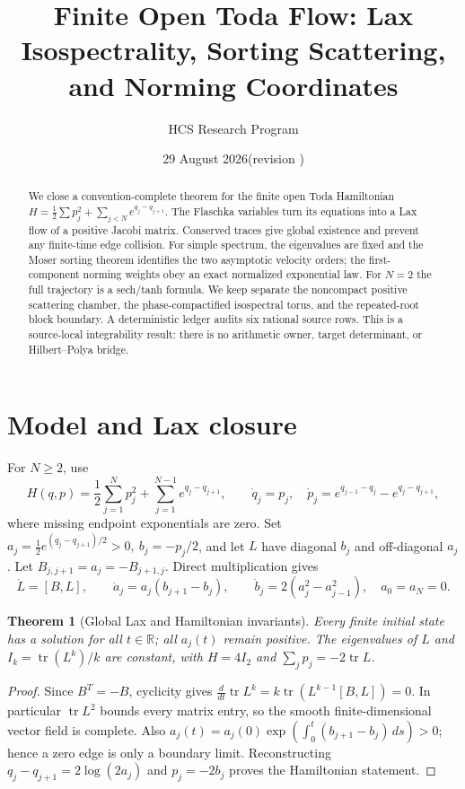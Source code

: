 \documentclass[10pt]{article}
\title{Finite Open Toda Flow: Lax Isospectrality, Sorting Scattering, and Norming Coordinates}
\author{HCS Research Program}
\date{29 August 2026\quad (revision \CRevisionRound)}
\newtheorem{theorem}{Theorem}
\newcommand{\R}{\mathbb R}
\newcommand{\Tr}{\operatorname{tr}}
\begin{document}
\maketitle
\begin{abstract}
We close a convention-complete theorem for the finite open Toda Hamiltonian
\(H=\frac12\sum p_j^2+\sum_{j<N}e^{q_j-q_{j+1}}\).
The Flaschka variables turn its equations into a Lax flow of a positive
Jacobi matrix. Conserved traces give global existence and prevent any
finite-time edge collision. For simple spectrum, the eigenvalues are fixed
and the Moser sorting theorem identifies the two asymptotic velocity orders;
the first-component norming weights obey an exact normalized exponential law.
For \(N=2\) the full trajectory is a sech/tanh formula. We keep separate the
noncompact positive scattering chamber, the phase-compactified isospectral
torus, and the repeated-root block boundary. A deterministic ledger audits
six rational source rows. This is a source-local integrability result:
there is no arithmetic owner, target determinant, or Hilbert--Polya bridge.
\end{abstract}

\section{Model and Lax closure}
For \(N\ge2\), use
\begin{equation}
 H(q,p)=\frac12\sum_{j=1}^{N}p_j^2+
 \sum_{j=1}^{N-1}e^{q_j-q_{j+1}},\qquad
 \dot q_j=p_j,\quad
 \dot p_j=e^{q_{j-1}-q_j}-e^{q_j-q_{j+1}}, \tag{1}
\end{equation}
where missing endpoint exponentials are zero. Set
\(a_j=\tfrac12e^{(q_j-q_{j+1})/2}>0,\ b_j=-p_j/2\), and let \(L\) have
diagonal \(b_j\) and off-diagonal \(a_j\). Let \(B_{j,j+1}=a_j=-B_{j+1,j}\).
Direct multiplication gives
\begin{equation}
 \dot L=[B,L],\qquad
 \dot a_j=a_j(b_{j+1}-b_j),\qquad
 \dot b_j=2(a_j^2-a_{j-1}^2),\quad a_0=a_N=0. \tag{2}
\end{equation}

\begin{theorem}[Global Lax and Hamiltonian invariants]\label{thm:global}
Every finite initial state has a solution for all \(t\in\R\); all \(a_j(t)\)
remain positive. The eigenvalues of \(L\) and
\(I_k=\Tr(L^k)/k\) are constant, with \(H=4I_2\) and
\(\sum_jp_j=-2\Tr L\).
\end{theorem}
\begin{proof}
Since \(B^T=-B\), cyclicity gives
\(\frac d{dt}\Tr L^k=k\Tr(L^{k-1}[B,L])=0\). In particular
\(\Tr L^2\) bounds every matrix entry, so the smooth finite-dimensional vector
field is complete. Also
\(a_j(t)=a_j(0)\exp(\int_0^t(b_{j+1}-b_j)\,ds)>0\); hence a zero edge is only
a boundary limit. Reconstructing
\(q_j-q_{j+1}=2\log(2a_j)\) and \(p_j=-2b_j\) proves the Hamiltonian statement.
\end{proof}
\end{document}
